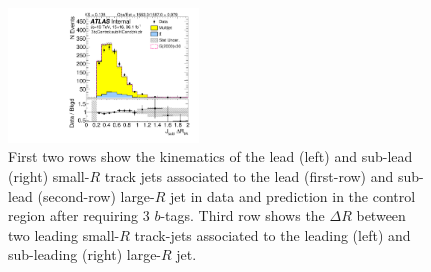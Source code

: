 \begin{figure}[htbp!]
\begin{center}
\includegraphics[width=0.45\textwidth,angle=-90]{figures/boosted/Control/b77_ThreeTag_Control_sublHCand_trk_dr.pdf}
  \caption{First two rows show the kinematics of the lead (left) and sub-lead (right) small-$R$ track jets associated to the lead (first-row) and sub-lead (second-row) large-$R$ jet in data and prediction in the control region after requiring 3 $b$-tags. Third row shows the $\Delta R$ between two leading small-$R$ track-jets associated to the leading (left) and sub-leading (right) large-$R$ jet.  }
  \label{fig:boosted-3b-control-ak2}
\end{center}
\end{figure}


